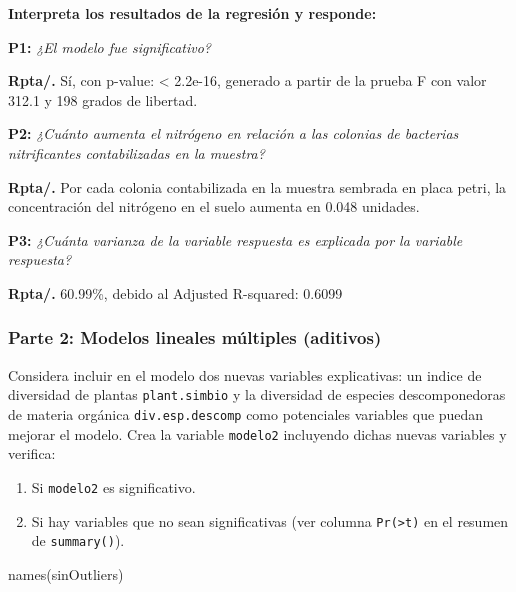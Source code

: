 \documentclass[
]{article}
\newenvironment{Shaded}{}{}
\newcommand{\FunctionTok}[1]{\textcolor[rgb]{0.02,0.16,0.49}{#1}}
\newcommand{\NormalTok}[1]{#1}
\begin{document}
\textbf{Interpreta los resultados de la regresión y responde:}

\textbf{P1:} \emph{¿El modelo fue significativo?}

\textbf{Rpta/.} Sí, con p-value: \textless{} 2.2e-16, generado a partir
de la prueba F con valor 312.1 y 198 grados de libertad.

\textbf{\hfill\break
P2:} \emph{¿Cuánto aumenta el nitrógeno en relación a las colonias de
bacterias nitrificantes contabilizadas en la muestra?}

\textbf{Rpta/.} Por cada colonia contabilizada en la muestra sembrada en
placa petri, la concentración del nitrógeno en el suelo aumenta en 0.048
unidades.

\textbf{P3:} \emph{¿Cuánta varianza de la variable respuesta es
explicada por la variable respuesta?}

\textbf{Rpta/.} 60.99\%, debido al Adjusted R-squared: 0.6099

\hypertarget{parte-2-modelos-lineales-muxfaltiples-aditivos}{%
\subsubsection{\texorpdfstring{\textbf{Parte 2: Modelos lineales
múltiples
(aditivos)}}{Parte 2: Modelos lineales múltiples (aditivos)}}\label{parte-2-modelos-lineales-muxfaltiples-aditivos}}

Considera incluir en el modelo dos nuevas variables explicativas: un
indice de diversidad de plantas \texttt{plant.simbio} y la diversidad de
especies descomponedoras de materia orgánica \texttt{div.esp.descomp}
como potenciales variables que puedan mejorar el modelo. Crea la
variable \texttt{modelo2} incluyendo dichas nuevas variables y verifica:

\begin{enumerate}
\def\labelenumi{\arabic{enumi}.}
\item
  Si \texttt{modelo2} es significativo.
\item
  Si hay variables que no sean significativas (ver columna
  \texttt{Pr(\textgreater{}\textbar{}t\textbar{})} en el resumen de
  \texttt{summary()}).
\end{enumerate}

\begin{Shaded}
\begin{Highlighting}[]
\FunctionTok{names}\NormalTok{(sinOutliers)}
\end{Highlighting}
\end{Shaded}
\end{document}
